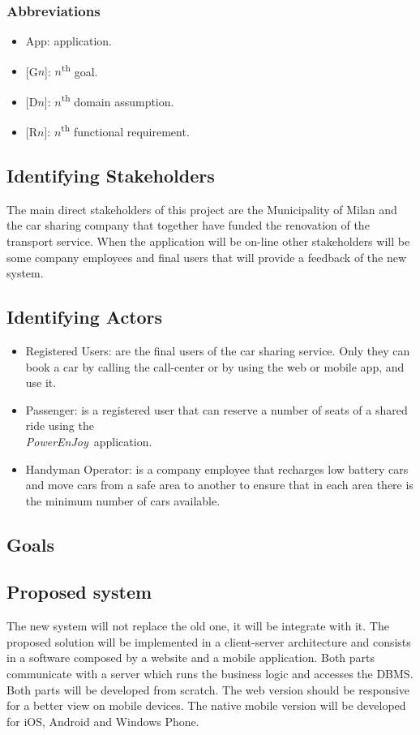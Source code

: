 \documentclass{article}
\newcommand{\pej}{\mbox{\normalfont\itshape PowerEnJoy }}
\begin{document}
		\subsubsection{Abbreviations}
			\begin{itemize}
				\item App: application.
				\item {[}G$n${]}: $n$\textsuperscript{th} goal.
				\item {[}D$n${]}: $n$\textsuperscript{th} domain assumption.
				\item {[}R$n${]}: $n$\textsuperscript{th} functional requirement.
			\end{itemize}
		\subsection{Identifying Stakeholders}
		The main direct stakeholders of this project are the Municipality of Milan and the car sharing company that together have funded the renovation of the transport service. When the application will be on-line other stakeholders will be some company employees and final users that will provide a feedback of the new system.
		\subsection{Identifying Actors}
			\begin{itemize}
				\item Registered Users: are the final users of the car sharing service. Only they can book a car by calling the call-center or by using the web or mobile app, and use it.
				\item Passenger: is a registered user that can reserve a number of seats of a shared ride using the\\ \pej application.
				\item Handyman Operator: is a company employee that recharges low battery cars and move cars from a safe area to another to ensure that in each area there is the minimum number of cars available.
			\end{itemize}
		\subsection{Goals} \label{sec:goals}
		
		
		\subsection{Proposed system}
		The new system will not replace the old one, it will be integrate with it. The proposed solution will be implemented in a client-server architecture and consists in a software composed by a website and a mobile application. Both parts communicate with a server which runs the business logic and accesses the DBMS. Both parts will be developed from scratch. The web version should be responsive for a better view on mobile devices. The native mobile version will be developed for iOS, Android and Windows Phone.
			
\end{document}
